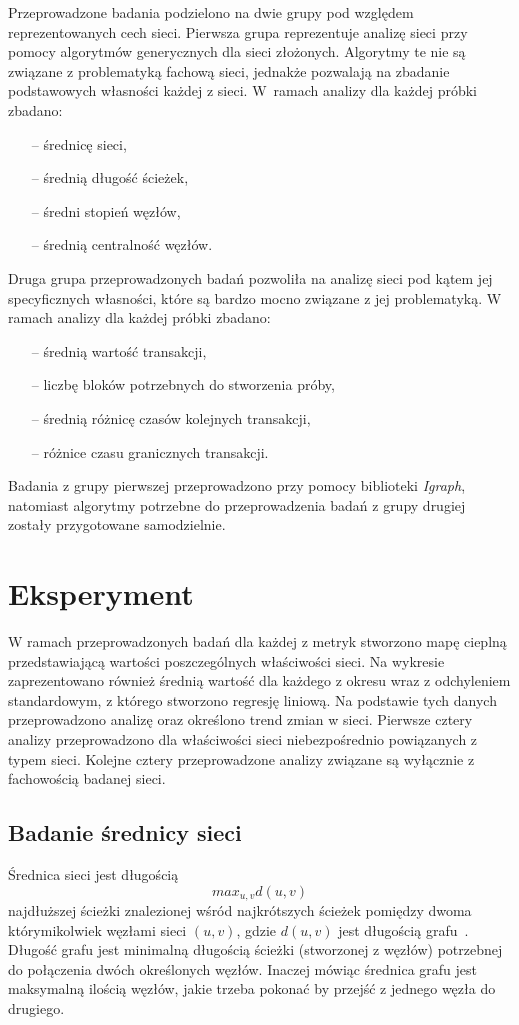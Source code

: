 \documentclass[12pt, oneside, final, openany]{mgr}
\begin{document}
\indent Przeprowadzone badania podzielono na dwie grupy pod względem reprezentowanych cech sieci. Pierwsza grupa reprezentuje analizę sieci przy pomocy algorytmów generycznych dla sieci złożonych. Algorytmy te nie są związane z problematyką fachową sieci, jednakże pozwalają na zbadanie podstawowych własności każdej z sieci. W~ramach analizy dla każdej próbki zbadano:
\begin{itemize}
\item[--] średnicę sieci,
\item[--] średnią długość ścieżek,
\item[--] średni stopień węzłów,
\item[--] średnią centralność węzłów.
\end{itemize}
Druga grupa przeprowadzonych badań pozwoliła na analizę sieci pod kątem jej specyficznych własności, które są bardzo mocno związane z jej problematyką. W ramach analizy dla każdej próbki zbadano:
\begin{itemize}
\item[--] średnią wartość transakcji,
\item[--] liczbę bloków potrzebnych do stworzenia próby,
\item[--] średnią różnicę czasów kolejnych transakcji,
\item[--] różnice czasu granicznych transakcji.
\end{itemize}

\indent Badania z grupy pierwszej przeprowadzono przy pomocy biblioteki \textit{Igraph}, natomiast algorytmy potrzebne do przeprowadzenia badań z grupy drugiej zostały przygotowane samodzielnie.

\section{Eksperyment}
W ramach przeprowadzonych badań dla każdej z metryk stworzono mapę cieplną przedstawiającą wartości poszczególnych właściwości sieci. Na wykresie zaprezentowano również średnią wartość dla każdego z okresu wraz z odchyleniem standardowym, z którego stworzono regresję liniową. Na podstawie tych danych przeprowadzono analizę oraz określono trend zmian w sieci. Pierwsze cztery analizy przeprowadzono dla właściwości sieci niebezpośrednio powiązanych z typem sieci. Kolejne cztery przeprowadzone analizy związane są wyłącznie z fachowością badanej sieci.

\subsection{Badanie średnicy sieci}
\label{srednica_sieci}
\indent Średnica sieci jest długością 
\begin{equation}
\label{eq:srednica_sieci}
	max_{u,v}d(u,v)
\end{equation}
najdłuższej ścieżki znalezionej wśród najkrótszych ścieżek pomiędzy dwoma którymikolwiek węzłami sieci $(u,v)$, gdzie $d(u,v)$ jest długością grafu~\cite{barabasi2016network}. Długość grafu jest minimalną długością ścieżki (stworzonej z węzłów) potrzebnej do połączenia dwóch określonych węzłów. Inaczej mówiąc średnica grafu jest maksymalną ilością węzłów, jakie trzeba pokonać by przejść z jednego węzła do drugiego.
\end{document}
